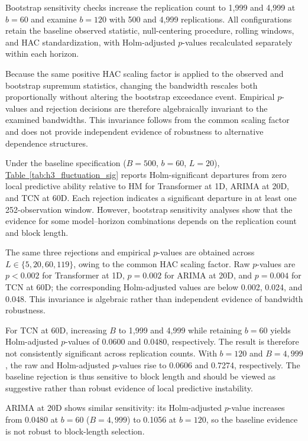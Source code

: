 \documentclass[runningheads,orivec]{llncs}
\begin{document}
Bootstrap sensitivity checks increase the replication count to 1,999 and 4,999 at $b=60$ and examine $b=120$ with 500 and 4,999 replications. All configurations retain the baseline observed statistic, null-centering procedure, rolling windows, and HAC standardization, with Holm-adjusted $p$-values recalculated separately within each horizon.

Because the same positive HAC scaling factor is applied to the observed and bootstrap supremum statistics, changing the bandwidth rescales both proportionally without altering the bootstrap exceedance event. Empirical $p$-values and rejection decisions are therefore algebraically invariant to the examined bandwidths. This invariance follows from the common scaling factor and does not provide independent evidence of robustness to alternative dependence structures.

Under the baseline specification ($B=500$, $b=60$, $L=20$), \hyperref[tab:h3_fluctuation_sig]{Table~\ref*{tab:h3_fluctuation_sig}} reports Holm-significant departures from zero local predictive ability relative to HM for Transformer at 1D, ARIMA at 20D, and TCN at 60D. Each rejection indicates a significant departure in at least one 252-observation window. However, bootstrap sensitivity analyses show that the evidence for some model--horizon combinations depends on the replication count and block length.

The same three rejections and empirical $p$-values are obtained across $L\in\{5,20,60,119\}$, owing to the common HAC scaling factor. Raw $p$-values are $p<0.002$ for Transformer at 1D, $p=0.002$ for ARIMA at 20D, and $p=0.004$ for TCN at 60D; the corresponding Holm-adjusted values are below 0.002, 0.024, and 0.048. This invariance is algebraic rather than independent evidence of bandwidth robustness.

For TCN at 60D, increasing $B$ to 1,999 and 4,999 while retaining $b=60$ yields Holm-adjusted $p$-values of 0.0600 and 0.0480, respectively. The result is therefore not consistently significant across replication counts. With $b=120$ and $B=4,999$, the raw and Holm-adjusted $p$-values rise to 0.0606 and 0.7274, respectively. The baseline rejection is thus sensitive to block length and should be viewed as suggestive rather than robust evidence of local predictive instability.

ARIMA at 20D shows similar sensitivity: its Holm-adjusted $p$-value increases from 0.0480 at $b=60$ ($B=4,999$) to 0.1056 at $b=120$, so the baseline evidence is not robust to block-length selection.
\end{document}
